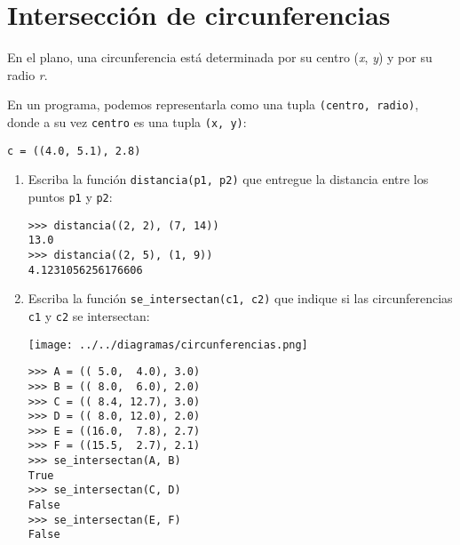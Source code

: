 \section{Intersección de circunferencias}

En el plano, una circunferencia está determinada por su centro
(\emph{x}, \emph{y}) y por su radio \emph{r}.

En un programa, podemos representarla como una tupla
\lstinline!(centro, radio)!, donde a su vez \lstinline!centro! es una
tupla \lstinline!(x, y)!:

\begin{lstlisting}
c = ((4.0, 5.1), 2.8)
\end{lstlisting}

\begin{enumerate}[1.]
\item
  Escriba la función \lstinline!distancia(p1, p2)! que entregue la
  distancia entre los puntos \lstinline!p1! y \lstinline!p2!:

\begin{lstlisting}
>>> distancia((2, 2), (7, 14))
13.0
>>> distancia((2, 5), (1, 9))
4.1231056256176606
\end{lstlisting}
\item
  Escriba la función \lstinline!se_intersectan(c1, c2)! que indique si
  las circunferencias \lstinline!c1! y \lstinline!c2! se intersectan:

  \texttt{[image: ../../diagramas/circunferencias.png]}

\begin{lstlisting}
>>> A = (( 5.0,  4.0), 3.0)
>>> B = (( 8.0,  6.0), 2.0)
>>> C = (( 8.4, 12.7), 3.0)
>>> D = (( 8.0, 12.0), 2.0)
>>> E = ((16.0,  7.8), 2.7)
>>> F = ((15.5,  2.7), 2.1)
>>> se_intersectan(A, B)
True
>>> se_intersectan(C, D)
False
>>> se_intersectan(E, F)
False
\end{lstlisting}
\end{enumerate}
